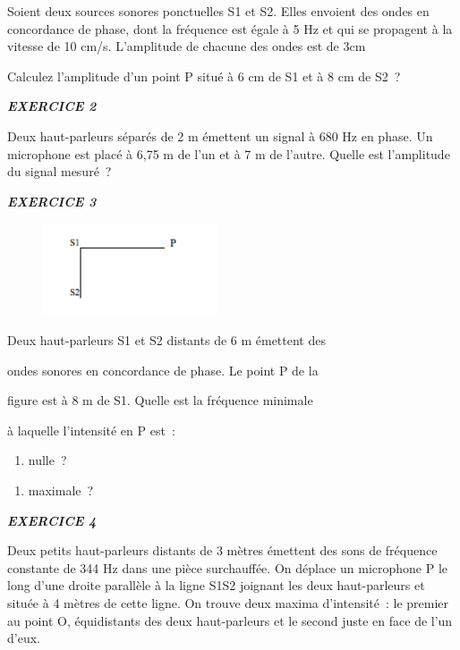 Soient deux sources sonores ponctuelles S1 et S2. Elles envoient des
ondes en concordance de phase, dont la fréquence est égale à 5 Hz et qui
se propagent à la vitesse de 10 cm/s. L'amplitude de chacune des ondes
est de 3cm

Calculez l'amplitude d'un point P situé à 6 cm de S1 et à 8 cm de S2~?

\emph{\textbf{EXERCICE 2}}

Deux haut-parleurs séparés de 2 m émettent un signal à 680 Hz en phase.
Un microphone est placé à 6,75 m de l'un et à 7 m de l'autre. Quelle est
l'amplitude du signal mesuré~?

\emph{\textbf{EXERCICE 3}}

\begin{figure}
\centering
\includegraphics[width=5.151cm,height=2.729cm]{Pictures/10000001000000BC000000630AF71C86AA2A0A65.png}
\caption{}
\end{figure}

Deux haut-parleurs S1 et S2 distants de 6 m émettent des

ondes sonores en concordance de phase. Le point P de la

figure est à 8 m de S1. Quelle est la fréquence minimale

à laquelle l'intensité en P est~:

\begin{enumerate}
\def\labelenumi{\alph{enumi})}
\tightlist
\item
  nulle~?
\end{enumerate}

\begin{enumerate}
\def\labelenumi{\alph{enumi})}
\tightlist
\item
  maximale~?
\end{enumerate}

\emph{\textbf{EXERCICE 4}}

Deux petits haut-parleurs distants de 3 mètres émettent des sons de
fréquence constante de 344 Hz dans une pièce surchauffée. On déplace un
microphone P le long d'une droite parallèle à la ligne S1S2 joignant les
deux haut-parleurs et située à 4 mètres de cette ligne. On trouve deux
maxima d'intensité~: le premier au point O, équidistants des deux
haut-parleurs et le second juste en face de l'un d'eux.

